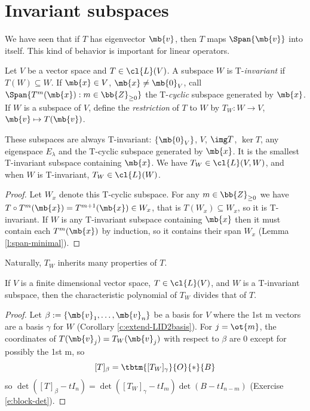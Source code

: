 \section{Invariant subspaces}
We have seen that if $T$ has eigenvector $\mb{v}$, then $T$ maps $\Span \{ \mb{v}\}$ into itself. This kind of behavior is important for linear operators.
\begin{defn}
Let $V$ be a vector space and $T \in \cl{L}(V)$. A subspace $W$ is T-\emph{invariant} if $T(W) \subseteq W$.
If $\mb{x}\in V$, $\mb{x}\neq \mb{0}_V$, call $\Span \{ T^m( \mb{x}): m \in \bb{Z}_{\geq 0}\}$ the T-\emph{cyclic} subspace generated by $\mb{x}$.
If $W$ is a subspace of $V$, define the \emph{restriction} of $T$ to $W$ by $T_W:W \to V$, $\mb{v}\mapsto T( \mb{v})$.
\end{defn}
\begin{exer}\label{e:smallest-tcyclic}
These subspaces are always T-invariant: $\{ \mb{0}_V \}$, $V$, $\img T$, $\ker T$, any eigenspace $E_\lambda$ and the T-cyclic subspace generated by $\mb{x}$. It is the smallest T-invariant subspace containing $\mb{x}$.
We have $T_W \in \cl{L}(V,W)$, and when $W$ is T-invariant, $T_W \in \cl{L}(W)$.
\end{exer}
\begin{proof}
Let $W_x$ denote this T-cyclic subspace. For any $m \in \bb{Z}_{\geq 0}$ we have $T \circ T^m( \mb{x})= T^{m+1}( \mb{x}) \in W_x$, that is $T(W_x) \subseteq W_x$, so it is T-invariant.
If $W$ is any T-invariant subspace containing $\mb{x}$ then it must contain each $T^m( \mb{x})$ by induction, so it contains their span $W_x$ (Lemma \ref{l:span-minimal}).
\end{proof}
Naturally, $T_W$ inherits many properties of $T$.
\begin{lem}\label{l:restrict-chrpoly}
If $V$ is a finite dimensional vector space, $T \in \cl{L}(V)$, and $W$ is a T-invariant subspace, then the characteristic polynomial of $T_W$ divides that of $T$.
\end{lem}
\begin{proof}
Let $\beta:= \{ \mb{v}_1, \ldots, \mb{v}_n \}$ be a basis for $V$ where the 1st m vectors are a basis $\gamma$ for $W$ (Corollary \ref{c:extend-LID2basis}). For $j= \ot{m}$, the coordinates of $T( \mb{v}_j)=T_W( \mb{v}_j)$ with respect to $\beta$ are 0 except for possibly the 1st m, so
\[ [T]_\beta = \tbtm{[T_W]_\gamma}{O}{*}{B}\]
so $\det ([T]_\beta -tI_n)= \det ([T_W]_\gamma -tI_m) \det (B-tI_{n-m})$ (Exercise \ref{e:block-det}).
\end{proof}
